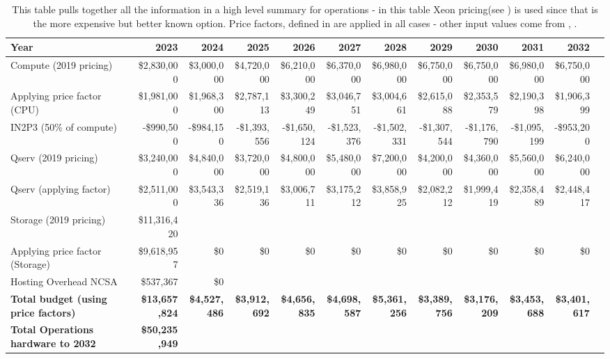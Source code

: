\tiny \begin{longtable} { |p{}  |r  |r  |r  |r  |r  |r  |r  |r  |r  |r  |r |} 
\caption{This table pulls together all the information in a high level summary for operations - in this table Xeon pricing(see ) is used since that is the more expensive but better known option. Price factors, defined in  are applied in all cases - other input values come from , .
 \label{tab:opsSummary}}\\ 
\hline 
\textbf{Year}&\textbf{2023}&\textbf{2024}&\textbf{2025}&\textbf{2026}&\textbf{2027}&\textbf{2028}&\textbf{2029}&\textbf{2030}&\textbf{2031}&\textbf{2032} \\ \hline
{Compute (2019 pricing)}&{\$2,830,000}&{\$3,000,000}&{\$4,720,000}&{\$6,210,000}&{\$6,370,000}&{\$6,980,000}&{\$6,750,000}&{\$6,750,000}&{\$6,980,000}&{\$6,750,000} \\ \hline
{Applying price factor (CPU)}&{\$1,981,000}&{\$1,968,300}&{\$2,787,113}&{\$3,300,249}&{\$3,046,751}&{\$3,004,661}&{\$2,615,088}&{\$2,353,579}&{\$2,190,398}&{\$1,906,399} \\ \hline
{IN2P3 (50\% of compute)}&{-\$990,500}&{-\$984,150}&{-\$1,393,556}&{-\$1,650,124}&{-\$1,523,376}&{-\$1,502,331}&{-\$1,307,544}&{-\$1,176,790}&{-\$1,095,199}&{-\$953,200} \\ \hline
{Qserv (2019 pricing)}&{\$3,240,000}&{\$4,840,000}&{\$3,720,000}&{\$4,800,000}&{\$5,480,000}&{\$7,200,000}&{\$4,200,000}&{\$4,360,000}&{\$5,560,000}&{\$6,240,000} \\ \hline
{Qserv (applying factor)}&{\$2,511,000}&{\$3,543,336}&{\$2,519,136}&{\$3,006,711}&{\$3,175,212}&{\$3,858,925}&{\$2,082,212}&{\$1,999,419}&{\$2,358,489}&{\$2,448,417} \\ \hline
{Storage (2019 pricing)}&{\$11,316,420}&&&&&&&&& \\ \hline
{Applying price factor (Storage)}&{\$9,618,957}&{\$0}&{\$0}&{\$0}&{\$0}&{\$0}&{\$0}&{\$0}&{\$0}&{\$0} \\ \hline
{Hosting Overhead NCSA
}&{\$537,367}&{\$0}&&&&&&&& \\ \hline
\textbf{Total budget (using price factors)}&\textbf{\$13,657,824}&\textbf{\$4,527,486}&\textbf{\$3,912,692}&\textbf{\$4,656,835}&\textbf{\$4,698,587}&\textbf{\$5,361,256}&\textbf{\$3,389,756}&\textbf{\$3,176,209}&\textbf{\$3,453,688}&\textbf{\$3,401,617} \\ \hline
\textbf{Total Operations hardware to 2032 }&\textbf{\$50,235,949}&&&&&&&&& \\ \hline
\end{longtable} \normalsize
